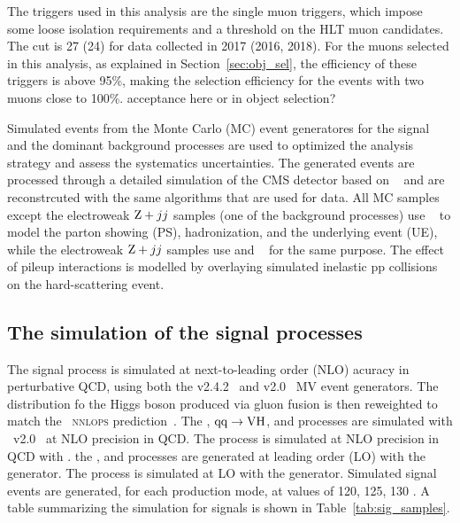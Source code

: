 The triggers used in this analysis are the single muon triggers, which impose some loose isolation requirements and a \pt threshold on the HLT muon candidates.
The \pt cut is 27 (24) \GeV for data collected in 2017 (2016, 2018). 
For the muons selected in this analysis, as explained in Section~\ref{sec:obj_sel}, the efficiency of these triggers is above 95\%, 
making the selection efficiency for the events with two muons close to 100\%.
acceptance here or in object selection?

Simulated events from the Monte Carlo (MC) event generatores for the signal and the dominant background processes are used to 
optimized the analysis strategy and assess the systematics uncertainties.
The generated events are processed through a detailed simulation of the CMS detector based on \GEANTfour~\cite{AGOSTINELLI2003250}
and are reconstrcuted with the same algorithms that are used for data.
All MC samples except the electroweak $\mathrm{Z}+jj$ samples (one of the background processes) use ~\cite{SJOSTRAND2015159} to model the parton showing (PS), 
hadronization, and the underlying event (UE), while the electroweak $\mathrm{Z}+jj$ samples use \HERWIGpp and \HERWIGSeven~\cite{Bellm:2015jjp} for the same purpose.
The effect of pileup interactions is modelled by overlaying simulated inelastic pp collisions on the hard-scattering event.\\

\bigskip
\subsection{The simulation of the signal processes}
The \ggH signal process is simulated at next-to-leading order (NLO) acuracy in perturbative QCD, using both the \MGvATNLO v2.4.2~\cite{Alwall:2014hca}
and \POWHEG v2.0~\cite{Nason_2004, Frixione_2007, Alioli:2010xd, Bagnaschi:2011tu} MV event generators. 
The \pt distribution fo the Higgs boson produced via gluon fusion is then reweighted to match the \POWHEG~\textsc{nnlops} prediction~\cite{Hamilton:2013fea,Hamilton:2015nsa}. 
The \qqH, ${\mathrm{q}\mathrm{q}\to\mathrm{V}\mathrm{H}}$, and \ttH processes are simulated with \POWHEG~v2.0~\cite{Nason:2009ai,Luisoni:2013kna,Hartanto:2015uka} at NLO precision in QCD. 
The \bbH process is simulated at NLO precision in QCD with \POWHEG.
the \tHq, and \tHW processes are generated at leading order (LO) with the \MGvATNLO generator.
The \ggZH process is simulated at LO with the \POWHEG generator.
Simulated signal events are generated, for each production mode, at \mh values of 120, 125, 130 \GeV.
A table summarizing the simulation for signals is shown in Table~\ref{tab:sig_samples}.

